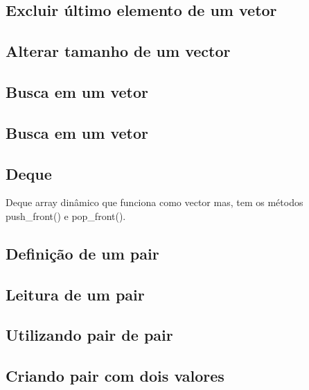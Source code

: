 \documentclass[a4paper,12pt]{article}
\begin{document}
\subsection{Excluir último elemento de um vetor}

\subsection{Alterar tamanho de um vector}

\subsection{Busca em um vetor}

\subsection{Busca em um vetor}

\subsection{Deque}
\indent Deque array dinâmico que funciona como vector mas, tem os métodos push\_front() e pop\_front().

\subsection{Definição de um pair}

\subsection{Leitura de um pair}

\subsection{Utilizando pair de pair}

\subsection{Criando pair com dois valores}
\end{document}
